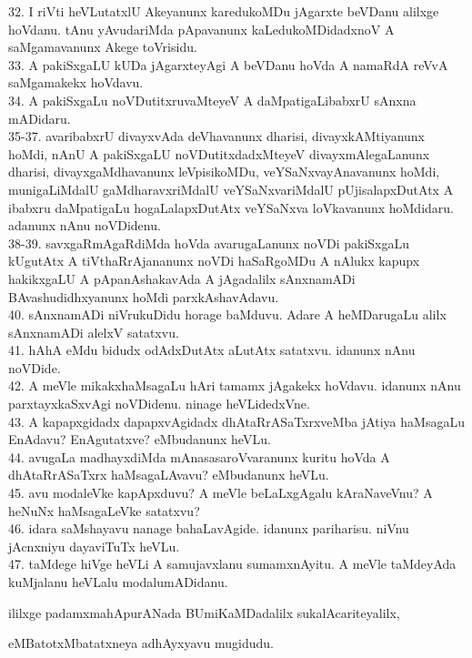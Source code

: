 \documentclass{article}
\begin{document}
32. I riVti heVLutatxlU Akeyanunx karedukoMDu jAgarxte beVDanu alilxge hoVdanu. tAnu yAvudariMda pApavanunx kaLedukoMDidadxnoV A saMgamavanunx Akege toVrisidu.\\
33. A pakiSxgaLU kUDa jAgarxteyAgi A beVDanu hoVda A namaRdA reVvA saMgamakekx hoVdavu.\\
34. A pakiSxgaLu noVDutitxruvaMteyeV A daMpatigaLibabxrU sAnxna mADidaru.\\
35-37. avaribabxrU divayxvAda deVhavanunx dharisi, divayxkAMtiyanunx hoMdi, nAnU A pakiSxgaLU noVDutitxdadxMteyeV divayxmAlegaLanunx dharisi, divayxgaMdhavanunx leVpisikoMDu, veYSaNxvayAnavanunx hoMdi, munigaLiMdalU gaMdharavxriMdalU veYSaNxvariMdalU pUjisalapxDutAtx A ibabxru daMpatigaLu hogaLalapxDutAtx veYSaNxva loVkavanunx hoMdidaru. adanunx nAnu noVDidenu.\\
38-39. savxgaRmAgaRdiMda hoVda avarugaLanunx noVDi pakiSxgaLu kUgutAtx A tiVthaRrAjananunx noVDi haSaRgoMDu A nAlukx kapupx hakikxgaLU A pApanAshakavAda A jAgadalilx sAnxnamADi BAvashudidhxyanunx hoMdi parxkAshavAdavu.\\
40. sAnxnamADi niVrukuDidu horage baMduvu. Adare A heMDarugaLu alilx sAnxnamADi alelxV satatxvu.\\
41. hAhA eMdu bidudx odAdxDutAtx aLutAtx satatxvu. idanunx nAnu noVDide.\\
42. A meVle mikakxhaMsagaLu hAri tamamx jAgakekx hoVdavu. idanunx nAnu parxtayxkaSxvAgi noVDidenu. ninage heVLidedxVne.\\
43. A kapapxgidadx dapapxvAgidadx dhAtaRrASaTxrxveMba jAtiya haMsagaLu EnAdavu? EnAgutatxve? eMbudanunx heVLu.\\
44. avugaLa madhayxdiMda mAnasasaroVvaranunx kuritu hoVda A dhAtaRrASaTxrx haMsagaLAvavu? eMbudanunx heVLu.\\
45. avu modaleVke kapApxduvu? A meVle beLaLxgAgalu kAraNaveVnu? A heNuNx haMsagaLeVke satatxvu?\\
46. idara saMshayavu nanage bahaLavAgide. idanunx pariharisu. niVnu jAcnxniyu dayaviTuTx heVLu.\\
47. taMdege hiVge heVLi A samujavxlanu sumamxnAyitu. A meVle taMdeyAda kuMjalanu heVLalu modalumADidanu.\\

\begin{center}
ililxge padamxmahApurANada BUmiKaMDadalilx sukalAcariteyalilx,
\end{center}

\begin{center}
eMBatotxMbatatxneya adhAyxyavu mugidudu.
\end{center}
\end{document}
